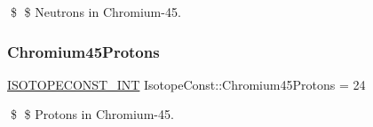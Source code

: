 \$ \$ Neutrons in Chromium-\/45. \mbox{\label{group___isotope_const-_chromium-_cr45_ga878cdea65e6dfb7b32ed84dc2e62a887}} 
\subsubsection{\texorpdfstring{Chromium45\+Protons}{Chromium45Protons}}
{\footnotesize\ttfamily \mbox{\hyperlink{group___isotope_const-_macros_ga5f18360b3e99483a35c32d789e62621c}{I\+S\+O\+T\+O\+P\+E\+C\+O\+N\+S\+T\+\_\+\+I\+NT}} Isotope\+Const\+::\+Chromium45\+Protons = 24}

\$ \$ Protons in Chromium-\/45. 